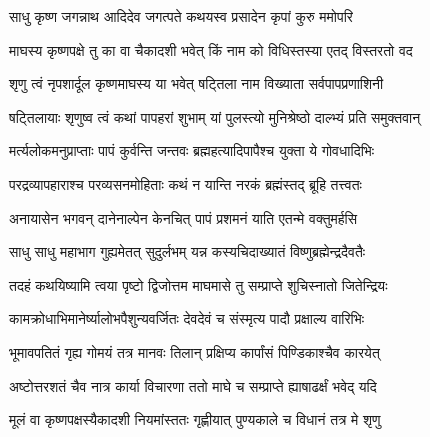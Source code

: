 \genMangalaShloka

\hyperref[sec:ekadashi_mahatmyam_padma_puranam]{\closesub}
\clearpage

\label{sec:padma-magha-krishna-shattila}

\ganapatyadiDhyanam
\padmaPuranam



\twolineshloka
{साधु कृष्ण जगन्नाथ आदिदेव जगत्पते}
{कथयस्व प्रसादेन कृपां कुरु ममोपरि}%

\twolineshloka
{माघस्य कृष्णपक्षे तु का वा चैकादशी भवेत्}
{किं नाम को विधिस्तस्या एतद् विस्तरतो वद}%


\twolineshloka
{शृणु त्वं नृपशार्दूल कृष्णमाघस्य या भवेत्}
{षट्तिला नाम विख्याता सर्वपापप्रणाशिनी}%

\twolineshloka
{षट्तिलायाः शृणुष्व त्वं कथां पापहरां शुभाम्}
{यां पुलस्त्यो मुनिश्रेष्ठो दाल्भ्यं प्रति समुक्तवान्}%


\twolineshloka
{मर्त्यलोकमनुप्राप्ताः पापं कुर्वन्ति जन्तवः}
{ब्रह्महत्यादिपापैश्च युक्ता ये गोवधादिभिः}%

\twolineshloka
{परद्रव्यापहाराश्च परव्यसनमोहिताः}
{कथं न यान्ति नरकं ब्रह्मंस्तद् ब्रूहि तत्त्वतः}%

\twolineshloka
{अनायासेन भगवन् दानेनाल्पेन केनचित्}
{पापं प्रशमनं याति एतन्मे वक्तुमर्हसि}%


\twolineshloka
{साधु साधु महाभाग गुह्यमेतत् सुदुर्लभम्}
{यन्न कस्यचिदाख्यातं विष्णुब्रह्मेन्द्रदैवतैः}%

\twolineshloka
{तदहं कथयिष्यामि त्वया पृष्टो द्विजोत्तम}
{माघमासे तु सम्प्राप्ते शुचिस्नातो जितेन्द्रियः}%

\twolineshloka
{कामक्रोधाभिमानेर्ष्यालोभपैशुन्यवर्जितः}
{देवदेवं च संस्मृत्य पादौ प्रक्षाल्य वारिभिः}%

\twolineshloka
{भूमावपतितं गृह्य गोमयं तत्र मानवः}
{तिलान् प्रक्षिप्य कार्पांसं पिण्डिकाश्चैव कारयेत्}%

\twolineshloka
{अष्टोत्तरशतं चैव नात्र कार्या विचारणा}
{ततो माघे च सम्प्राप्ते ह्याषाढर्क्षं भवेद् यदि}%

\twolineshloka
{मूलं वा कृष्णपक्षस्यैकादशी नियमांस्ततः}
{गृह्णीयात् पुण्यकाले च विधानं तत्र मे शृणु}%

